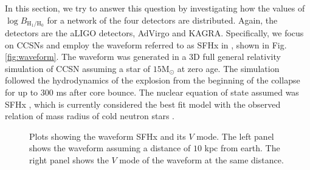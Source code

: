 \documentclass[aps,twocolumn,showpacs,groupedaddress, nofootinbib]{revtex4}  %
\begin{document}
In this section, we try to answer this question by investigating how the values of $\log B_{\text{H}_1 / \text{H}_0}$ 
for a network of the four detectors are distributed. Again, the detectors are the \ac{aLIGO} detectors, \ac{AdVirgo} and KAGRA.
Specifically, we focus on \acp{CCSN} and employ the waveform referred to as SFHx in \cite{kuroda2016new}, shown in Fig. \ref{fig:waveform}. 
The waveform was generated in a 3D full general relativity simulation of \ac{CCSN} assuming a star of $15\text{M}_\odot$ at zero age.
The simulation followed the hydrodynamics of the explosion from the beginning of the collapse for up to $300$ ms after core bounce.
The nuclear equation of state assumed was SFHx \cite{steiner2013core}, 
which is currently considered the best fit model with the observed relation of mass radius of cold neutron stars \cite{steiner2010equation, steiner2013core}.
\begin{figure}
     \begin{center}
        \quad
    \end{center}
    \caption{Plots showing the waveform SFHx and its $V$ mode.
    The left panel shows the waveform assuming a distance of $10$ kpc from earth.
    The right panel shows the $V$ mode of the waveform at the same distance.
    \label{fig:simpleV2}} 
\end{figure}
\end{document}
